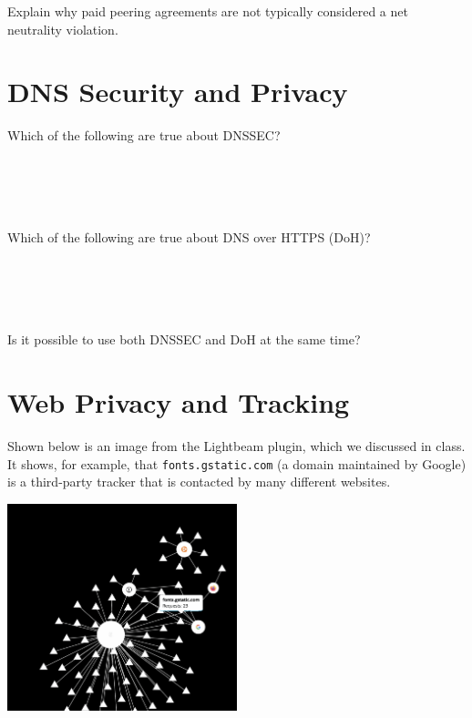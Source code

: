 Explain why paid peering agreements are not typically considered a net
neutrality violation.
\eprob

\section*{DNS Security and Privacy}

 Which of the following are true about DNSSEC?\\
\\
\\
\\
\\
\eprob

 Which of the following are true about DNS over HTTPS (DoH)?\\
\\
\\
\\
\\
\eprob

 Is it possible to use both DNSSEC and DoH at the same time?\\
\yesnoyes
\eprob

\newpage
\section*{Web Privacy and Tracking}

Shown below is an image from the Lightbeam plugin, which we discussed in
class. It shows, for example, that {\tt fonts.gstatic.com} (a domain
maintained by Google) is a third-party
tracker that is contacted by many different websites.  

\begin{center}
\includegraphics[width=0.5\textwidth]{lightbeam.png}
\end{center}

